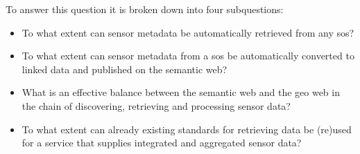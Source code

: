 To answer this question it is broken down into four subquestions:
\begin{itemize}
	\item To what extent can sensor metadata be automatically retrieved from any \acl{sos}?
	\item To what extent can sensor metadata from a \acl{sos} be automatically converted to linked data and published on the semantic web?
	\item  What is an effective balance between the semantic web and the geo web in the chain of discovering, retrieving and processing sensor data?
	\item To what extent can already existing standards for retrieving data be (re)used for a service that supplies integrated and aggregated sensor data?
\end{itemize}

